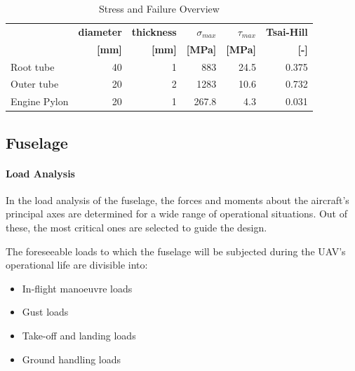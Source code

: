 \begin{table}[htbp]
  \centering
  \caption{Stress and Failure Overview}
    \begin{tabular}{lrrrrr}
    \toprule
          &\bfseries diameter &\bfseries thickness &\bfseries $\sigma_{max}$ &\bfseries $\tau_{max}$ &\bfseries Tsai-Hill \\
          &\bfseries [mm]  &\bfseries [mm]  &\bfseries [MPa] &\bfseries [MPa] &\bfseries [-] \\
    \midrule
    Root tube & 40    & 1     & 883   & 24.5  & 0.375 \\
    Outer tube & 20    & 2     & 1283  & 10.6  & 0.732 \\
    Engine Pylon & 20    & 1     & 267.8 & 4.3   & 0.031 \\
    \bottomrule
    \end{tabular}%
  \label{tab:tube_failure}%
\end{table}%



\subsection{Fuselage}

\paragraph{Load Analysis}
In the load analysis of the fuselage, the forces and moments about the aircraft's principal axes are determined for a wide range of operational situations. Out of these, the most critical ones are selected to guide the design.

The foreseeable loads to which the fuselage will be subjected during the UAV's operational life are divisible into:

\begin{itemize}
    \item In-flight manoeuvre loads
    \item Gust loads
    \item Take-off and landing loads
    \item Ground handling loads
\end{itemize}

